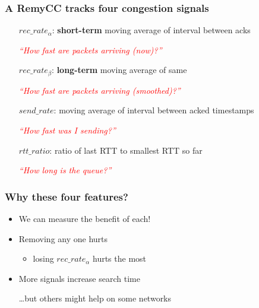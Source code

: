 \documentclass[svgnames]{beamer}
\begin{document}
\begin{frame}
\frametitle{A RemyCC tracks four congestion signals}

\large

\hspace{0.5 cm}\begin{minipage}{10.0 cm}
\begin{itemize}

\item[$rec\_rate_\alpha$:] \textbf{short-term} moving average of interval between acks

\textcolor{Red}{\textit{``How fast are packets arriving (now)?''}}

\item[$rec\_rate_\beta$:] \textbf{long-term} moving average of same

\textcolor{Red}{\textit{``How fast are packets arriving (smoothed)?''}}

\item[]

\item[$send\_rate$:] moving average of interval between acked timestamps

\textcolor{Red}{\textit{``How fast was I sending?''}}

\item[]

\item[$rtt\_ratio$:] ratio of last RTT to smallest RTT so far

\textcolor{Red}{\textit{``How long is the queue?''}}

\end{itemize}
\end{minipage}

\end{frame}

\begin{frame}
\frametitle{Why these four features?}

\Large

\begin{itemize}

\item We can measure the benefit of each!

\item[]

\item Removing any one hurts

\begin{itemize}
\item losing $rec\_rate_\alpha$ hurts the most
\end{itemize}

\item[]

\item More signals increase search time

\item[]

\item[] \ldots but others might help on some networks

\end{itemize}

\end{frame}
\end{document}
